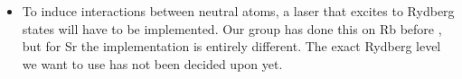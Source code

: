 \begin{itemize}
    \item To induce interactions between neutral atoms, a laser that excites to Rydberg states will have to be implemented. 
    Our group has done this on Rb before \cite{Bijnen2013}, but for Sr the implementation is entirely different. 
    The exact Rydberg level we want to use has not been decided upon yet. 
\end{itemize}
